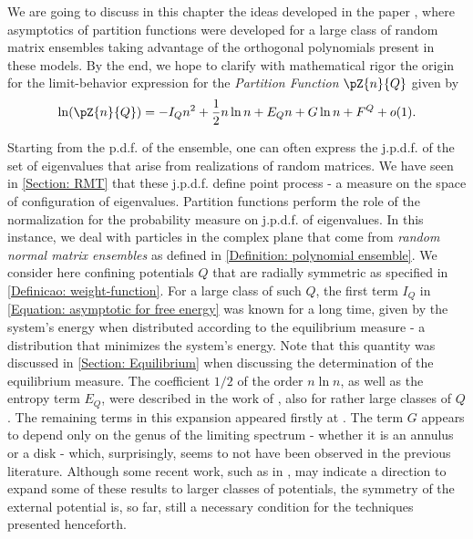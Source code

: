 We are going to discuss in this chapter the ideas developed in the paper , where asymptotics of partition functions were developed for a large class of random matrix ensembles taking advantage of the orthogonal polynomials present in these models. By the end, we hope to clarify with mathematical rigor the origin for the limit-behavior expression for the \textit{Partition Function} $\pZ{n}{Q}$ given by
\begin{equation}
	\ln(\pZ{n}{Q}) = -I_Q n^2+\frac{1}{2} n\ln n+E_Q n+G\ln n+F^Q + o(1).
	\label{Equation: asymptotic for free energy}
\end{equation}

Starting from the p.d.f. of the ensemble, one can often express the j.p.d.f. of the set of eigenvalues that arise from realizations of random matrices. We have seen in \autoref{Section: RMT} that these j.p.d.f. define point process - a measure on the space of configuration of eigenvalues. Partition functions perform the role of the normalization for the probability measure on j.p.d.f. of eigenvalues. In this instance, we deal with particles in the complex plane that come from \textit{random normal matrix ensembles} as defined in \autoref{Definition: polynomial ensemble}. We consider here confining potentials $Q$ that are radially symmetric as specified in \autoref{Definicao: weight-function}. For a large class of such $Q$, the first term $I_Q$ in \eqref{Equation: asymptotic for free energy} was known for a long time, given by the system's energy when distributed according to the equilibrium measure - a distribution that minimizes the system's energy. Note that this quantity was discussed in \autoref{Section: Equilibrium} when discussing the determination of the equilibrium measure. The coefficient $1/2$ of the order $n\ln n$, as well as the entropy term $E_Q$, were described in the work of , also for rather large classes of $Q$. The remaining terms in this expansion appeared firstly at . The term $G$ appears to depend only on the genus of the limiting spectrum -  whether it is an annulus or a disk  - which, surprisingly, seems to not have been observed in the previous literature.  Although some recent work, such as in , may indicate a direction to expand some of these results to larger classes of potentials, the symmetry of the external potential is, so far, still a necessary condition for the techniques presented henceforth.

